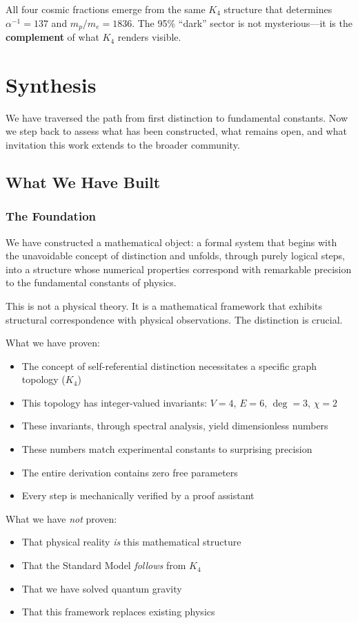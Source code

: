 \documentclass[11pt,a4paper]{book}
\begin{document}
All four cosmic fractions emerge from the same $K_4$ structure that determines 
$\alpha^{-1} = 137$ and $m_p/m_e = 1836$. The 95\% ``dark'' sector is not mysterious---it 
is the \textbf{complement} of what $K_4$ renders visible.

\part{Synthesis}

We have traversed the path from first distinction to fundamental constants. Now we step back to assess what has been constructed, what remains open, and what invitation this work extends to the broader community.

\chapter{What We Have Built}

\section{The Foundation}

We have constructed a mathematical object: a formal system that begins with the unavoidable concept of distinction and unfolds, through purely logical steps, into a structure whose numerical properties correspond with remarkable precision to the fundamental constants of physics.

This is not a physical theory. It is a mathematical framework that exhibits structural correspondence with physical observations. The distinction is crucial.

What we have proven:
\begin{itemize}
\item The concept of self-referential distinction necessitates a specific graph topology ($K_4$)
\item This topology has integer-valued invariants: $V=4$, $E=6$, $\deg=3$, $\chi=2$
\item These invariants, through spectral analysis, yield dimensionless numbers
\item These numbers match experimental constants to surprising precision
\item The entire derivation contains zero free parameters
\item Every step is mechanically verified by a proof assistant
\end{itemize}

What we have \emph{not} proven:
\begin{itemize}
\item That physical reality \emph{is} this mathematical structure
\item That the Standard Model \emph{follows} from $K_4$
\item That we have solved quantum gravity
\item That this framework replaces existing physics
\end{itemize}
\end{document}
